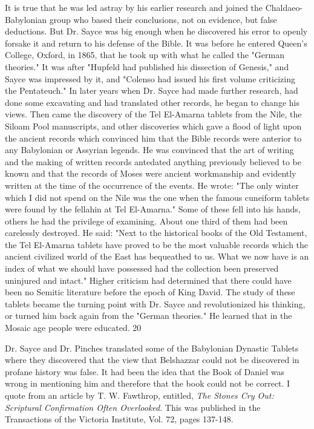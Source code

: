 It is true that he was led astray by his earlier research and joined the Chaldaeo-Babylonian
group who based their conclusions, not on evidence, but false deductions. But Dr. Sayce was
big enough when he discovered his error to openly forsake it and return to his defense of the
Bible. It was before he entered Queen's College, Oxford, in 1865, that he took up with what
he called the "German theories." It was after "Hupfeld had published his dissection of
Genesis," and Sayce was impressed by it, and "Colenso had issued his first volume criticizing
the Pentateuch." In later years when Dr. Sayce had made further research, had done some
excavating and had translated other records, he began to change his views. Then came the
discovery of the Tel El-Amarna tablets from the Nile, the Siloam Pool manuscripts, and other
discoveries which gave a flood of light upon the ancient records which convinced him that
the Bible records were anterior to any Babylonian or Assyrian legends. He was convinced
that the art of writing and the making of written records antedated anything previously
believed to be known and that the records of Moses were ancient workmanship and evidently
written at the time of the occurrence of the events. He wrote: "The only winter which I did
not spend on the Nile was the one when the famous cuneiform tablets were found by the
fellahin at Tel El-Amarna." Some of these fell into his hands, others he had the privilege of
examining. About one third of them had been carelessly destroyed. He said: "Next to the
historical books of the Old Testament, the Tel El-Amarna tablets have proved to be the most
valuable records which the ancient civilized world of the East has bequeathed to us. What we
now have is an index of what we should have possessed had the collection been preserved
uninjured and intact." Higher criticism had determined that there could have been no Semitic
literature before the epoch of King David. The study of these tablets became the turning point
with Dr. Sayce and revolutionized his thinking, or turned him back again from the "German
theories." He learned that in the Mosaic age people were educated. 20

Dr. Sayce and Dr. Pinches translated some of the Babylonian Dynastic Tablets where they
discovered that the view that Belshazzar could not be discovered in profane history was false.
It had been the idea that the Book of Daniel was wrong in mentioning him and therefore that
the book could not be correct. I quote from an article by T. W. Fawthrop, entitled, \textit{The Stones
Cry Out: Scriptural Confirmation Often Overlooked}. This was published in the Transactions
of the Victoria Institute, Vol. 72, pages 137-148.

